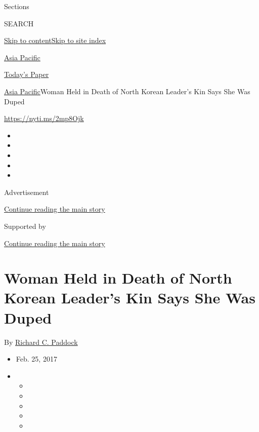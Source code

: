 Sections

SEARCH

\protect\hyperlink{site-content}{Skip to
content}\protect\hyperlink{site-index}{Skip to site index}

\href{https://www.nytimes.com/section/world/asia}{Asia Pacific}

\href{https://myaccount.nytimes.com/auth/login?response_type=cookie\&client_id=vi}{}

\href{https://www.nytimes.com/section/todayspaper}{Today's Paper}

\href{/section/world/asia}{Asia Pacific}\textbar{}Woman Held in Death of
North Korean Leader's Kin Says She Was Duped

\url{https://nyti.ms/2mp8Ojk}

\begin{itemize}
\item
\item
\item
\item
\item
\end{itemize}

Advertisement

\protect\hyperlink{after-top}{Continue reading the main story}

Supported by

\protect\hyperlink{after-sponsor}{Continue reading the main story}

\hypertarget{woman-held-in-death-of-north-korean-leaders-kin-says-she-was-duped}{%
\section{Woman Held in Death of North Korean Leader's Kin Says She Was
Duped}\label{woman-held-in-death-of-north-korean-leaders-kin-says-she-was-duped}}

By \href{https://www.nytimes.com/by/richard-c-paddock}{Richard C.
Paddock}

\begin{itemize}
\item
  Feb. 25, 2017
\item
  \begin{itemize}
  \item
  \item
  \item
  \item
  \item
  \end{itemize}
\end{itemize}

